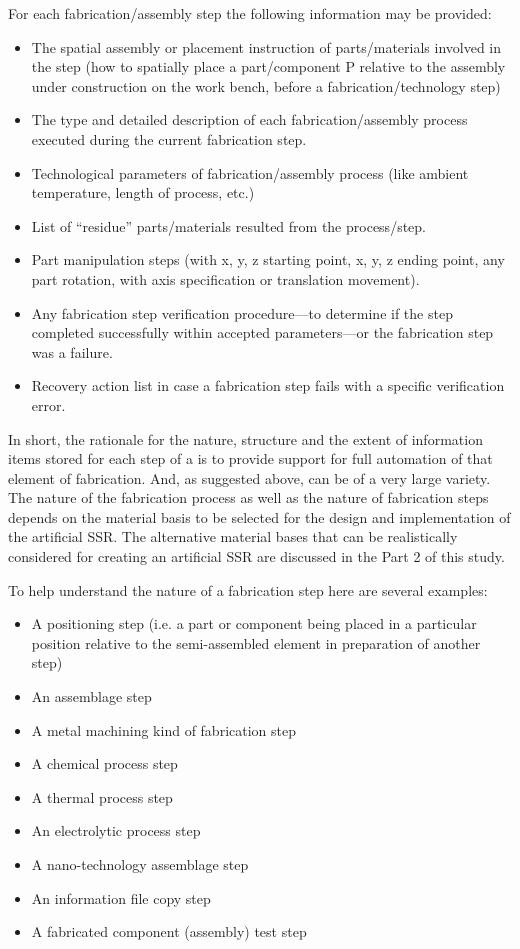 For each fabrication/assembly step the following information may be
provided:

\begin{itemize}
\item The spatial assembly or placement instruction of parts/materials
involved in the step (how to spatially place a part/component P
relative to the assembly under construction on the work bench, before a
fabrication/technology step)
\item The type and detailed description of each fabrication/assembly
process executed during the current fabrication step.
\item Technological parameters of fabrication/assembly process (like
ambient temperature, length of process, etc.)
\item List of “residue” parts/materials resulted from the process/step.
\item Part manipulation steps (with x, y, z starting point, x, y, z
ending point, any part rotation, with axis specification or translation
movement).
\item Any fabrication step verification procedure---to determine if the
step completed successfully within accepted parameters---or the
fabrication step was a failure.
\item Recovery action list in case a fabrication step fails with a
specific verification error.
\end{itemize}

In short, the rationale for the nature, structure and the extent of
information items stored for each step of a  
is to provide support for full automation of that element of
fabrication. And, as suggested above,  can be
of a very large variety. The nature of the fabrication process as well
as the nature of fabrication steps depends on the material basis to be
selected for the design and implementation of the artificial SSR. The
alternative material bases that can be realistically considered for
creating an artificial SSR are discussed in the Part 2 of this study.

To help understand the nature of a fabrication step here are several
examples:

\begin{itemize}
\item A positioning step (i.e. a part or component being placed in a particular position relative
to the semi-assembled element in preparation of another step)
\item An assemblage step
\item A metal machining kind of fabrication step
\item A chemical process step
\item A thermal process step
\item An electrolytic process step
\item A nano-technology assemblage step
\item An information file copy step
\item A fabricated component (assembly) test step
\end{itemize}

